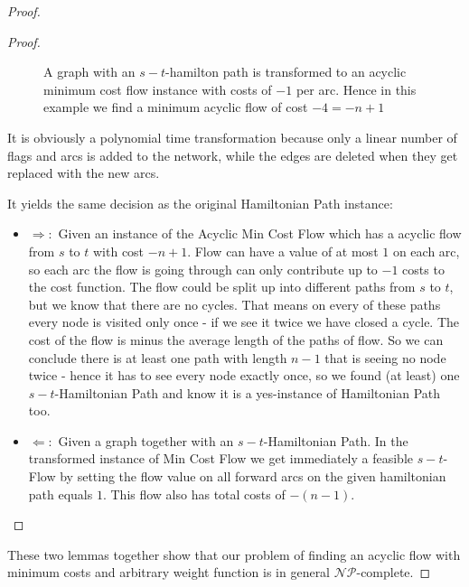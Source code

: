 \begin{proof}
\begin{proof}
\begin{figure}[h!]
\caption{A graph with an $s-t$-hamilton path is transformed to an acyclic minimum cost flow instance with costs of $-1$ 
per arc. Hence in this example we find a minimum acyclic flow of cost $-4=-n+1$}
\label{bild:hampathreduct}
\end{figure}

It is obviously a polynomial time transformation because only a linear number of flags and arcs is added to the 
network, while the edges are deleted when they get replaced with the new arcs.

It yields the same decision as the original Hamiltonian Path instance:
\begin{itemize}
 \item $\Rightarrow:$ Given an instance of the Acyclic Min Cost Flow which has a acyclic flow from $s$ to $t$ with cost 
$-n+1$.
Flow can have a value of at most $1$ on each arc, so each arc the flow is going through can only contribute up to $-1$ 
costs to the cost function. The flow could be split up into different paths from $s$ to $t$, but we know that there are 
no cycles. That means on every of these paths every node is visited only once - if we see it twice we have closed a 
cycle. The cost of the flow is minus the average length of the paths of flow. So we can conclude there is at least one 
path with length $n-1$ that is seeing no node twice - hence it has to see every node exactly once, so we found (at 
least) one $s-t$-Hamiltonian Path and know it is a yes-instance of Hamiltonian Path too.

\item $\Leftarrow:$ Given a graph together with an $s-t$-Hamiltonian Path. In the transformed instance of Min Cost Flow 
we get immediately a feasible $s-t$-Flow by setting the flow value on all forward arcs on the given hamiltonian path 
equals $1$. This flow also has total costs of $-(n-1)$.
\end{itemize}
\end{proof}

These two lemmas together show that our problem of finding an acyclic flow with minimum costs and arbitrary weight 
function is in general $\mathcal{NP}$-complete.
\end{proof}
